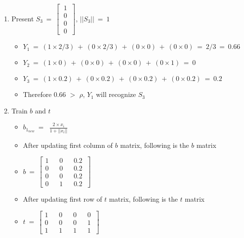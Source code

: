 \documentclass[12pt]{article}
\begin{document}
\begin{enumerate}
	\item Present $S_3 \ = \ \begin{bmatrix}
		\ 1 \  \\ \ 0 \ \\  \ 0 \  \\  \ 0 \   
	\end{bmatrix}$, $|| S_3 || \ = \ 1 $

	\begin{itemize}
		\item $Y_1 \ = \ (1 \times 2/3) \ + \ (0 \times 2/3) \ + \ (0 \times 0) \ + \ (0 \times 0)  \ = \ 2/3 \ = \ 0.66$
		\item $Y_2 \ = \ (1 \times 0) \ + \ (0 \times 0) \ + \ (0 \times 0) \ + \ (0 \times 1)  \ = \ 0$
		\item $Y_3 \ = \ (1 \times 0.2) \ + \ (0 \times 0.2) \ + \ (0 \times 0.2) \ + \ (0 \times 0.2)  \ = \ 0.2$
		\item Therefore 0.66 $>$ $\rho$, $Y_1$ will recognize $S_3$
	\end{itemize}

	\item Train $b$ and $t$
	
	\begin{itemize}
		\item $b_{1_{new}} \ = \ $  $\frac{2 \times x_i}{1 + || x_i ||}$
		
		\item After updating first column of $b$ matrix, following is the $b$ matrix
		
		\item $ b \ = \ \begin{bmatrix}
			1 && 0 && 0.2 \ \\
			0 && 0 && 0.2 \ \\
			0 && 0 && 0.2 \ \\
			0 && 1 && 0.2 \
		\end{bmatrix}$
	
		\item After updating first row of $t$ matrix, following is the $t$ matrix
		
		\item $ t  \ = \ \begin{bmatrix} 1 && 0 && 0 && 0 \\ 0 && 0 && 0 && 1 \\ 1 && 1 && 1 && 1 \ \end{bmatrix}$ 
		
	\end{itemize}


\end{enumerate}
\end{document}
